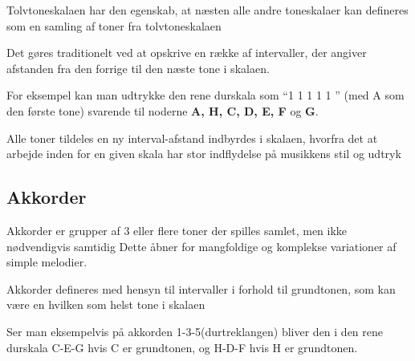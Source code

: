 Tolvtoneskalaen har den egenskab, at næsten alle andre toneskalaer kan defineres som en samling af toner fra tolvtoneskalaen
\cite{msparkMusic}

Det gøres traditionelt ved at opskrive en række af intervaller, der angiver afstanden fra den forrige til den næste tone i skalaen.

For eksempel kan man udtrykke den rene durskala som “1 1  1 1 1 ” (med A som den første tone) svarende til noderne \textbf{A, H, C, D, E, F} og \textbf{G}.

Alle toner tildeles en ny interval-afstand indbyrdes i skalaen, hvorfra det at arbejde inden for en given skala har stor indflydelse på musikkens stil og udtryk
\cite{msparkMusic}

\subsection{Akkorder}

Akkorder er grupper af 3 eller flere toner der spilles samlet, men ikke nødvendigvis samtidig
Dette åbner for mangfoldige og komplekse variationer af simple melodier.

Akkorder defineres med hensyn til intervaller i forhold til grundtonen, som kan være en hvilken som helst tone i skalaen
\cite{msparkMusic}

Ser man eksempelvis på akkorden 1-3-5(durtreklangen) bliver den i den rene durskala C-E-G hvis C er grundtonen, og H-D-F hvis H er grundtonen.

